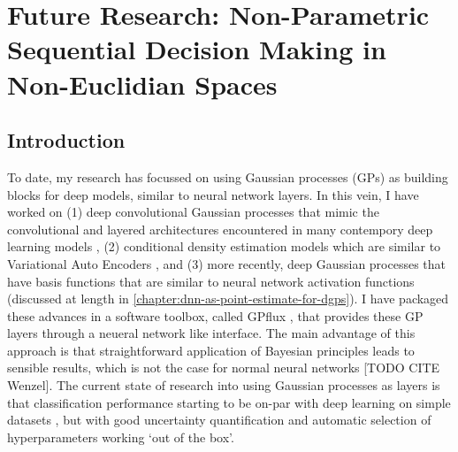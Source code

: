 \chapter{Future Research: Non-Parametric Sequential Decision Making in Non-Euclidian Spaces}
\label{chapter:future-research}


\section{Introduction}
To date, my research has focussed on using Gaussian processes (GPs) as building blocks for deep models, similar to neural network layers. In this vein, I have worked on (1) deep convolutional Gaussian processes that mimic the convolutional and layered architectures encountered in many contempory deep learning models \citep{Dutordoir2020convolutional}, (2) conditional density estimation models which are similar to Variational Auto Encoders \citep{dutordoir2018cde,Salimbeni2019}, and (3) more recently, deep Gaussian processes that have basis functions that are similar to neural network activation functions \citep{dutordoir2021deep} (discussed at length in \cref{chapter:dnn-as-point-estimate-for-dgps}). I have packaged these advances in a software toolbox, called GPflux \citep{dutordoir2021gpflux}, that provides these GP layers through a neueral network like interface. The main advantage of this approach is that straightforward application of Bayesian principles leads to sensible results, which is not the case for normal neural networks [TODO CITE Wenzel]. The current state of research into using Gaussian processes as layers is that classification performance starting to be on-par with deep learning on simple datasets \citep{dutordoir2018cde}, but with good uncertainty quantification and automatic selection of hyperparameters working `out of the box'.

